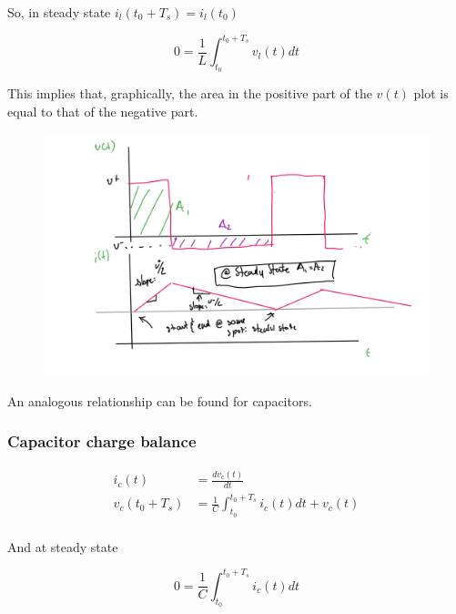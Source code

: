 \documentclass[../notes.tex]{subfiles}
\begin{document}
So, in steady state $ i_l(t_0 + T_s) = i_l(t_0) $ 

\begin{equation}
 0 = \frac{1}{L} \int_{t_0}^{t_0 + T_s}  v_l(t) dt
\end{equation}

This implies that, graphically, the area in the positive part of the $ v(t) $ plot is equal to that of the negative part.


\begin{figure}[H]
	\centering
	\includegraphics[width=0.8\linewidth]{img/image_2022-09-26-11-44-02.png}
\end{figure}




An analogous relationship can be found for capacitors.

\subsubsection{Capacitor charge balance}


\begin{equation}
	\begin{split}
		i_c(t) &= \frac{d v_c(t)}{dt}\\
		 v_c(t_0+T_s)&= \frac{1}{C} \int_{t_0}^{t_0 + T_s} i_c(t) dt + v_c(t)    \\
	\end{split}
\end{equation}

And at steady state

\begin{equation}
	0 = \frac{1}{C} \int_{t_0}^{t_0 + T_s} i_c(t) dt
\end{equation}
\end{document}
